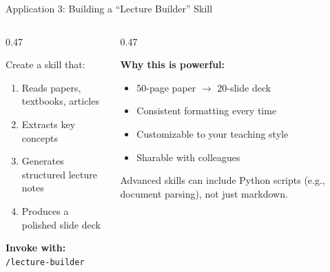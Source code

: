 \documentclass[aspectratio=169, 10pt]{beamer}
\begin{document}
\begin{frame}{Application 3: Building a ``Lecture Builder'' Skill}
\begin{columns}[T]
\begin{column}{0.47\textwidth}
\begin{tcolorbox}[keybox, title={\faCubes\quad The Goal}]
\small
Create a skill that:
\begin{enumerate}\setlength{\itemsep}{1pt}
  \item Reads papers, textbooks, articles
  \item Extracts key concepts
  \item Generates structured lecture notes
  \item Produces a polished slide deck
\end{enumerate}
\vskip2pt
\textbf{Invoke with:} \texttt{/lecture-builder}
\end{tcolorbox}
\end{column}
\begin{column}{0.47\textwidth}
\begin{tcolorbox}[accentbox]
\small
\textbf{Why this is powerful:}
\begin{itemize}\setlength{\itemsep}{0pt}\small
  \item 50-page paper $\rightarrow$ 20-slide deck
  \item Consistent formatting every time
  \item Customizable to your teaching style
  \item Sharable with colleagues
\end{itemize}
\end{tcolorbox}
\vskip3pt
{\tiny\color{CoolGray} Advanced skills can include Python scripts (e.g., document parsing), not just markdown.}
\end{column}
\end{columns}
\end{frame}
\end{document}

